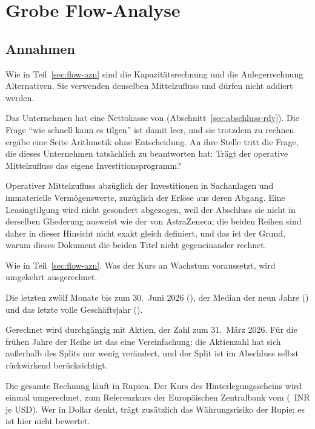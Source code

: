 \section{Grobe Flow-Analyse}
\label{sec:flow-rdy}

\subsection{Annahmen}
\label{sec:annahmen-rdy}

 Wie in Teil~\ref{sec:flow-azn} sind
die Kapazit\"atsrechnung und die Anlegerrechnung Alternativen. Sie verwenden
denselben Mittelzufluss und d\"urfen nicht addiert werden.

 Das Unternehmen hat eine
Nettokasse von \MioINR{\RdyNettokasse} (Abschnitt~\ref{sec:abschluss-rdy}).
Die Frage \enquote{wie schnell kann es tilgen} ist damit leer, und sie
trotzdem zu rechnen erg\"abe eine Seite Arithmetik ohne Entscheidung. An ihre
Stelle tritt die Frage, die dieses Unternehmen tats\"achlich zu beantworten
hat: Tr\"agt der operative Mittelzufluss das eigene Investitionsprogramm?

 Operativer Mittelzufluss abz\"uglich der
Investitionen in Sachanlagen und immaterielle Verm\"ogenswerte, zuz\"uglich
der Erl\"ose aus deren Abgang. Eine Leasingtilgung wird nicht gesondert
abgezogen, weil der Abschluss sie nicht in derselben Gliederung ausweist wie
der von AstraZeneca; die beiden Reihen sind daher in dieser Hinsicht nicht
exakt gleich definiert, und das ist der Grund, warum dieses Dokument die
beiden Titel nicht gegeneinander rechnet.

 Wie in Teil~\ref{sec:flow-azn}.
Was der Kurs an Wachstum voraussetzt, wird umgekehrt ausgerechnet.

 Die letzten zw\"olf Monate bis zum 30.~Juni 2026
(\INRje{\RdyFcfLtm}), der Median der neun Jahre (\INRje{\RdyFcfMedian}) und
das letzte volle Gesch\"aftsjahr (\INRje{\RdyFcfVoll}).

 Gerechnet wird durchg\"angig mit
\Stueck{\RdyAktienAusgegeben} Aktien, der Zahl zum 31.~M\"arz 2026. F\"ur die
fr\"uhen Jahre der Reihe ist das eine Vereinfachung; die Aktienzahl hat sich
au{\ss}erhalb des Splits nur wenig ver\"andert, und der Split ist im Abschluss
selbst r\"uckwirkend ber\"ucksichtigt.

 Die gesamte Rechnung l\"auft in Rupien. Der Kurs des
Hinterlegungsscheins wird einmal umgerechnet, zum Referenzkurs der
Europ\"aischen Zentralbank vom \Datum{\RdyKursTag}
(\Kurswert{\Wechselkurs}~INR je USD).
Wer in Dollar denkt, tr\"agt zus\"atzlich das W\"ahrungsrisiko der Rupie; es
ist hier nicht bewertet.

